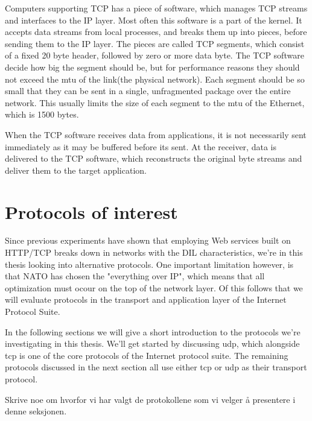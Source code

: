 Computers supporting TCP has a piece of software, which manages TCP streams and
interfaces to the IP layer. Most often this software is a part of the
kernel\cite{computer-networks}. It accepts data streams from local processes,
and breaks them up into pieces, before sending them to the IP layer. The pieces
are called TCP segments, which consist of a fixed 20 byte header, followed by
zero or more data byte. The TCP software decide how big the segment should be,
but for performance reasons they should not exceed the \gls{mtu} of the
link(the physical network). Each segment should be so small that they can be
sent in a single, unfragmented package over the entire network. This usually
limits the size of each segment to the \gls{mtu} of the Ethernet, which is 1500
bytes.

When the TCP software receives data from applications, it is not necessarily
sent immediately as it may be buffered before its sent. At the receiver, data is
delivered to the TCP software, which reconstructs the original byte streams and
deliver them to the target application.


\section{Protocols of interest}


Since previous experiments have shown that employing Web services built on
HTTP/TCP breaks down in networks with the DIL characteristics, we're in this
thesis looking into alternative protocols. One important limitation however, is
that NATO has chosen the "everything over IP", which means that all optimization
must ocour on the top of the network layer. Of this follows that we will
evaluate protocols in the transport and application layer of the Internet
Protocol Suite.

In the following sections we will give a short introduction to the protocols
we're investigating in this thesis. We'll get started by discussing \gls{udp},
which alongside \gls{tcp} is one of the core protocols of the Internet protocol
suite. The remaining protocols discussed in the next section all use either
\gls{tcp} or \gls{udp} as their transport protocol.

Skrive noe om hvorfor vi har valgt de protokollene som vi velger å presentere i denne seksjonen.

\subsection{}

